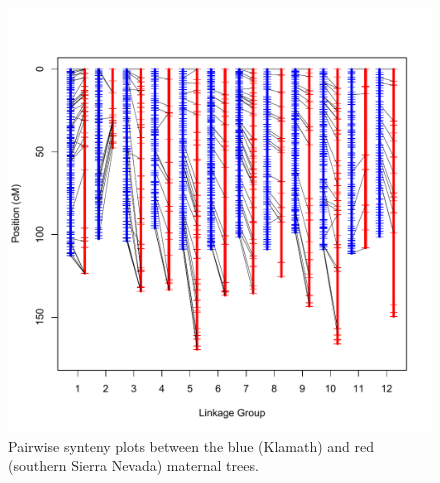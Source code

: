 \documentclass[smallextended]{svjour3}
\begin{document}
\begin{figure}[ht]
  \centering
  \includegraphics[width=\textwidth]{red_blue_synteny}
  \caption{Pairwise synteny plots between the blue (Klamath) and red (southern Sierra Nevada) maternal trees.}
  \label{f:con}
\end{figure}
\end{document}
